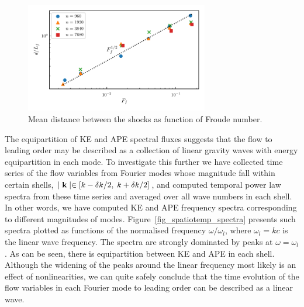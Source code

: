 \documentclass{jfm}
\begin{document}
\begin{figure}
\centerline{\includegraphics[width=8cm]{../Pyfig/fig_shock_sep.pdf}}
\caption{Mean distance between the shocks as function of Froude number.  }
\label{fig_distance}
\end{figure}




The equipartition of KE and APE spectral fluxes suggests that the flow to
leading order may be described as a collection of linear gravity waves with energy
equipartition in each mode. To investigate this further we have
collected time series of the flow variables from Fourier modes whose magnitude
fall within certain shells, $ \mid {\bf k} \mid \in [ k -\delta k/2, \; k+
\delta k/2] $, and computed temporal power law spectra from these time series
and averaged over all wave numbers in each shell. In other words, we have
computed KE and APE frequency spectra corresponding to different magnitudes of
modes. Figure~\ref{fig_spatiotemp_spectra} presents such spectra plotted as 
functions of the normalised frequency $\omega/\omega_l$, where $ \omega_l = kc
$ is the linear wave frequency. The spectra are strongly dominated by peaks at
$\omega = \omega_l$. As can be seen, there is equipartition between KE and APE
in each shell. Although the widening of the peaks around the linear frequency
most likely is an effect of nonlinearities, we can quite safely conclude that
the time evolution of the flow variables in each Fourier mode to leading order
can be described as a linear wave.
\end{document}
